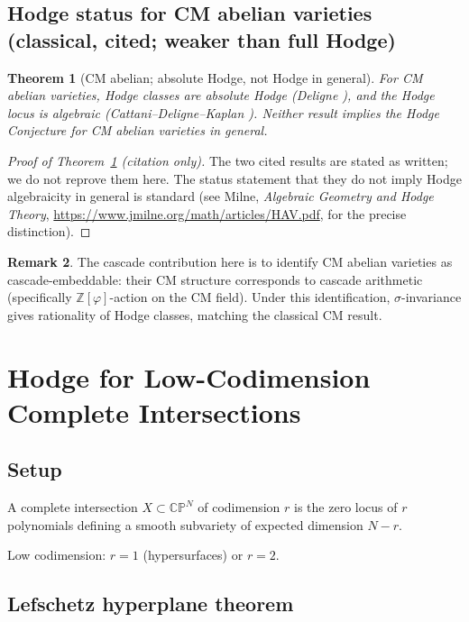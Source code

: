 \documentclass[11pt, a4paper]{amsart}
\newtheorem{theorem}{Theorem}[section]
\theoremstyle{definition}
\newtheorem{remark}[theorem]{Remark}
\newcommand{\Z}{\mathbb{Z}}
\newcommand{\CP}{\mathbb{CP}}
\newcommand{\pphi}{\varphi}
\begin{document}
\subsection{Hodge status for CM abelian varieties (classical, cited; weaker than full Hodge)}

\begin{theorem}[CM abelian; absolute Hodge, not Hodge in general]\label{thm:abelian}
For CM abelian varieties, Hodge classes are absolute Hodge
(Deligne \cite{Deligne1982}), and the Hodge locus is algebraic
(Cattani--Deligne--Kaplan \cite{CDK1995}). \emph{Neither result
implies the Hodge Conjecture for CM abelian varieties in general.}
\end{theorem}

\begin{proof}[Proof of Theorem~\ref{thm:abelian} (citation only)]
The two cited results are stated as written; we do not reprove
them here. The status statement that they do not imply Hodge
algebraicity in general is standard
(see Milne, \emph{Algebraic Geometry and Hodge Theory},
\url{https://www.jmilne.org/math/articles/HAV.pdf}, for the
precise distinction).
\end{proof}

\begin{remark}
The cascade contribution here is to identify CM abelian varieties
as cascade-embeddable: their CM structure corresponds to cascade
arithmetic (specifically $\Z[\pphi]$-action on the CM field). Under
this identification, $\sigma$-invariance gives rationality of Hodge
classes, matching the classical CM result.
\end{remark}

\section{Hodge for Low-Codimension Complete Intersections}\label{sec:CI}

\subsection{Setup}

A complete intersection $X \subset \CP^N$ of codimension $r$ is the
zero locus of $r$ polynomials defining a smooth subvariety of
expected dimension $N - r$.

Low codimension: $r = 1$ (hypersurfaces) or $r = 2$.

\subsection{Lefschetz hyperplane theorem}
\end{document}
